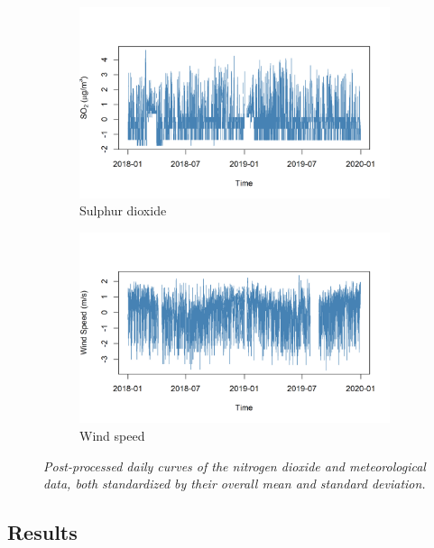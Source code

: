 \begin{figure}[H]
            \begin{subfigure}{0.48\linewidth}
               \centering
               \includegraphics[width=\linewidth]{../images/transformed_so2.png}
            \caption{Sulphur dioxide}
            \end{subfigure}
            \hfill
            \begin{subfigure}{0.48\linewidth}
               \centering
               \includegraphics[width=\linewidth]{../images/transformed_speed.png}
               \caption{Wind speed}
            \end{subfigure}

            \caption{\textit{Post-processed daily curves of the nitrogen dioxide and meteorological data, both standardized by their overall mean and standard deviation.}}
         \end{figure}
   
   \subsection{Results}

